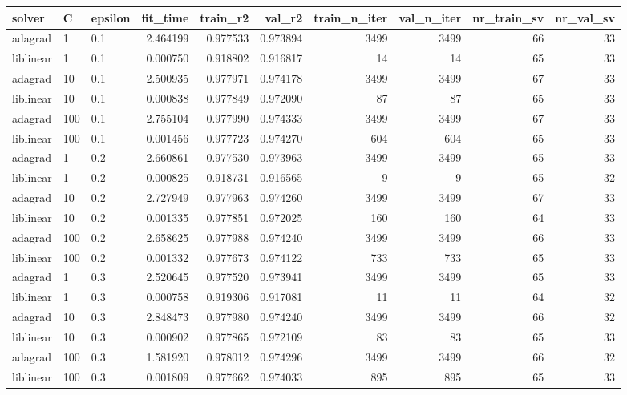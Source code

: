 \begin{tabular}{lllrrrrrrr}
\toprule
   solver &   C & epsilon &  fit\_time &  train\_r2 &   val\_r2 &  train\_n\_iter &  val\_n\_iter &  nr\_train\_sv &  nr\_val\_sv \\
\midrule
  adagrad &   1 &     0.1 &  2.464199 &  0.977533 & 0.973894 &          3499 &        3499 &           66 &         33 \\
liblinear &   1 &     0.1 &  0.000750 &  0.918802 & 0.916817 &            14 &          14 &           65 &         33 \\
  adagrad &  10 &     0.1 &  2.500935 &  0.977971 & 0.974178 &          3499 &        3499 &           67 &         33 \\
liblinear &  10 &     0.1 &  0.000838 &  0.977849 & 0.972090 &            87 &          87 &           65 &         33 \\
  adagrad & 100 &     0.1 &  2.755104 &  0.977990 & 0.974333 &          3499 &        3499 &           67 &         33 \\
liblinear & 100 &     0.1 &  0.001456 &  0.977723 & 0.974270 &           604 &         604 &           65 &         33 \\
  adagrad &   1 &     0.2 &  2.660861 &  0.977530 & 0.973963 &          3499 &        3499 &           65 &         33 \\
liblinear &   1 &     0.2 &  0.000825 &  0.918731 & 0.916565 &             9 &           9 &           65 &         32 \\
  adagrad &  10 &     0.2 &  2.727949 &  0.977963 & 0.974260 &          3499 &        3499 &           67 &         33 \\
liblinear &  10 &     0.2 &  0.001335 &  0.977851 & 0.972025 &           160 &         160 &           64 &         33 \\
  adagrad & 100 &     0.2 &  2.658625 &  0.977988 & 0.974240 &          3499 &        3499 &           66 &         33 \\
liblinear & 100 &     0.2 &  0.001332 &  0.977673 & 0.974122 &           733 &         733 &           65 &         33 \\
  adagrad &   1 &     0.3 &  2.520645 &  0.977520 & 0.973941 &          3499 &        3499 &           65 &         33 \\
liblinear &   1 &     0.3 &  0.000758 &  0.919306 & 0.917081 &            11 &          11 &           64 &         32 \\
  adagrad &  10 &     0.3 &  2.848473 &  0.977980 & 0.974240 &          3499 &        3499 &           66 &         32 \\
liblinear &  10 &     0.3 &  0.000902 &  0.977865 & 0.972109 &            83 &          83 &           65 &         33 \\
  adagrad & 100 &     0.3 &  1.581920 &  0.978012 & 0.974296 &          3499 &        3499 &           66 &         32 \\
liblinear & 100 &     0.3 &  0.001809 &  0.977662 & 0.974033 &           895 &         895 &           65 &         33 \\
\bottomrule
\end{tabular}
